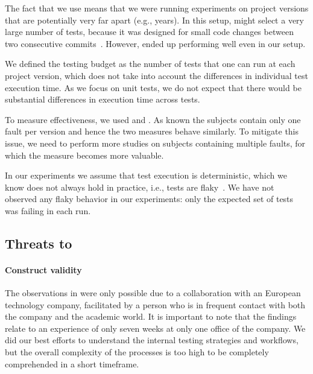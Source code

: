 The fact that we use \dfj means that we were running experiments on
project versions that are potentially very far apart (e.g., years).
In this setup, \ek might select a very large number of tests, because
it was designed for small code changes between two
consecutive commits~\cite{gligoricEk, VasicETAL17EkstaziSharp}.  However, 
\ek ended up performing well
even in our setup.

We defined the testing budget as the number of tests that one can run
at each project version, which does not take into account the
differences in individual test execution time.  As we focus on unit
tests, we do not expect that there would be substantial differences in
execution time across tests.

To measure effectiveness, we used \ttff and \apfd. As known the \dfj subjects contain only one fault per version and hence the two measures behave similarly. 
To mitigate this issue, we need to perform more studies on subjects containing multiple faults, for which the \apfd measure becomes more valuable. 

In our experiments we assume that test execution is deterministic,
which we know  does not always hold in practice, i.e.,
tests are flaky~\cite{luo2014empirical,harman2018start}.
We have not observed any flaky behavior in our
experiments: only the expected set of tests was failing in each run.

\subsection{Threats to  }

\paragraph{Construct validity}
The observations in  were only possible due to a collaboration with an European technology company, facilitated by a person who is in frequent contact with both the company and the academic world.
It is important to note that the findings relate to an experience of only seven weeks at only one office of the company.
We did our best efforts to understand the internal testing strategies and workflows, but the overall complexity of the processes is too high to be completely comprehended in a short timeframe.

